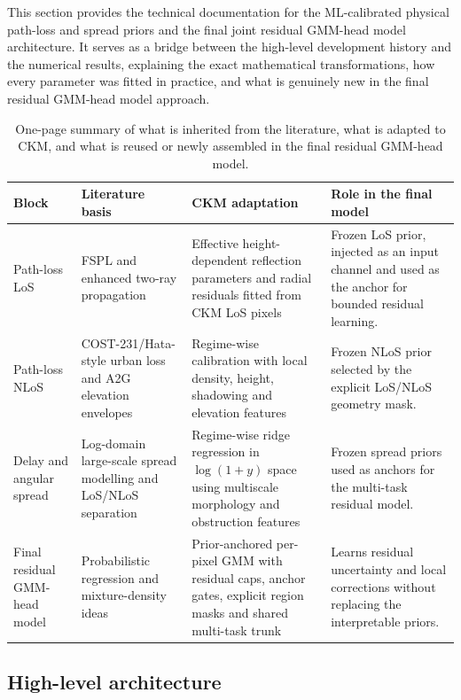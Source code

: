 This section provides the technical documentation for the ML-calibrated physical
path-loss and spread priors and the final joint residual GMM-head model
architecture. It serves as a bridge between the high-level development history
and the numerical results, explaining the exact mathematical transformations,
how every parameter was fitted in practice, and what is genuinely new in the
final residual GMM-head model approach.

\begin{table}[H]
\centering
\small
\begin{tabularx}{\textwidth}{p{2.2cm} p{3.1cm} p{4.0cm} X}
\toprule
\textbf{Block} & \textbf{Literature basis} & \textbf{CKM adaptation} &
\textbf{Role in the final model} \\
\midrule
Path-loss LoS & FSPL and enhanced two-ray propagation &
Effective height-dependent reflection parameters and radial residuals fitted
from CKM LoS pixels &
Frozen LoS prior, injected as an input channel and used as the anchor for
bounded residual learning. \\
\addlinespace
Path-loss NLoS & COST-231/Hata-style urban loss and A2G elevation envelopes &
Regime-wise calibration with local density, height, shadowing and elevation
features &
Frozen NLoS prior selected by the explicit LoS/NLoS geometry mask. \\
\addlinespace
Delay and angular spread & Log-domain large-scale spread modelling and
LoS/NLoS separation &
Regime-wise ridge regression in \(\log(1+y)\) space using multiscale
morphology and obstruction features &
Frozen spread priors used as anchors for the multi-task residual model. \\
\addlinespace
Final residual GMM-head model & Probabilistic regression and mixture-density
ideas &
Prior-anchored per-pixel GMM with residual caps, anchor gates, explicit
region masks and shared multi-task trunk &
Learns residual uncertainty and local corrections without replacing the
interpretable priors. \\
\bottomrule
\end{tabularx}
\caption{One-page summary of what is inherited from the literature, what is
adapted to CKM, and what is reused or newly assembled in the final
residual GMM-head model.}
\label{tab:executive_summary}
\end{table}

\subsection{High-level architecture}

